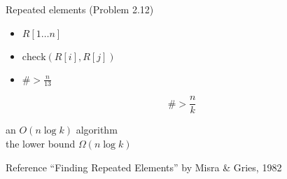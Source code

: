 \begin{frame}{Repeated elements (Problem 2.12)}
  \begin{itemize}
	\item $R[1 \dots n]$
	\item $\text{check}(R[i], R[j])$
	\item $\# > \frac{n}{13}$
  \end{itemize}

  \pause
  \vspace{0.30cm}

  \[
	\# > \frac{n}{k}
  \]

  \begin{center}
    an $O(n \log k)$ algorithm \\
    the lower bound $\Omega(n \log k)$
  \end{center}

  \begin{alertblock}{Reference}
	``Finding Repeated Elements'' by Misra \& Gries, 1982
  \end{alertblock}
\end{frame}
